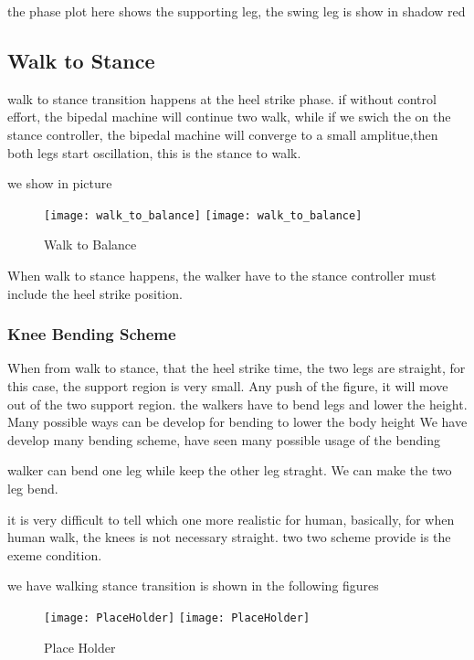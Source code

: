 the phase plot here shows the supporting leg, the swing leg is show in shadow red


\subsection{Walk to Stance}
walk to stance transition happens at the heel strike phase.
if without control effort, the bipedal machine will continue two walk, while if we swich the on the stance controller,
the bipedal machine will converge to a small amplitue,then both legs start oscillation, this is the stance to walk.

we show in picture
\begin{figure}[!htbp]
  \begin{center}
    \leavevmode
    \ifpdf
      \texttt{[image: walk\_to\_balance]}
    \else
      \texttt{[image: walk\_to\_balance]}
    \fi
    \caption{Walk to Balance}
    \label{fig:walk to balance}
\end{center}
\end{figure}

When walk to stance happens, the walker have to the stance controller must include the heel strike position.


\subsubsection*{Knee Bending Scheme}
When from walk to stance, that the heel strike time, the two legs are straight, for this case, the support region is very small.
Any push of the figure, it will move out of the two support region.
the walkers have to bend legs and lower the height.
Many possible ways can be develop for bending to lower the body height
We have develop many bending scheme, have seen many possible usage of the bending

\begin{itemize}
		walker can bend one leg while keep the other leg straght.
		We can make the two leg bend.
\end{itemize}

it is very difficult to tell which one more realistic for human, basically, for when human walk, the knees is not necessary straight.
two two scheme provide is the exeme condition.

we have walking stance transition is shown in the following figures

\begin{figure}[!htbp]
  \begin{center}
    \leavevmode
    \ifpdf
      \texttt{[image: PlaceHolder]}
    \else
      \texttt{[image: PlaceHolder]}
    \fi
    \caption{Place Holder}
    \label{fig:walkstancestraight}
\end{center}
\end{figure}

